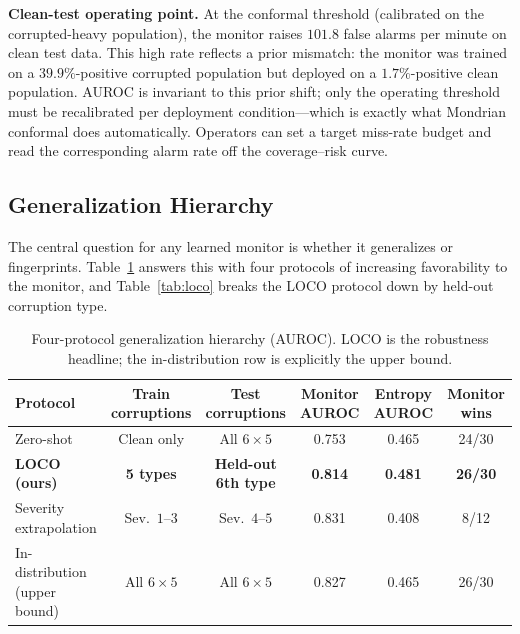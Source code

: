 \documentclass[letterpaper, 10 pt, conference]{ieeeconf}  %
\begin{document}

\textbf{Clean-test operating point.} At the conformal threshold (calibrated
on the corrupted-heavy population), the monitor raises $101.8$ false alarms
per minute on clean test data. This high rate reflects a prior mismatch: the
monitor was trained on a $39.9\%$-positive corrupted population but deployed
on a $1.7\%$-positive clean population. AUROC is invariant to this prior
shift; only the operating threshold must be recalibrated per deployment
condition---which is exactly what Mondrian conformal does automatically.
Operators can set a target miss-rate budget and read the corresponding alarm
rate off the coverage--risk curve.

\subsection{Generalization Hierarchy}

The central question for any learned monitor is whether it generalizes or
fingerprints. Table~\ref{tab:hierarchy} answers this with four protocols of
increasing favorability to the monitor, and Table~\ref{tab:loco} breaks the
LOCO protocol down by held-out corruption type.

\begin{table}[t]
\caption{Four-protocol generalization hierarchy (AUROC). LOCO is the robustness headline; the in-distribution row is explicitly the upper bound.}
\label{tab:hierarchy}
\centering
\small
\begin{tabular}{lccccc}
\toprule
Protocol & Train corruptions & Test corruptions & Monitor AUROC & Entropy AUROC & Monitor wins \\
\midrule
Zero-shot                          & Clean only & All $6\times5$       & 0.753 & 0.465 & 24/30 \\
\textbf{LOCO (ours)}               & \textbf{5 types} & \textbf{Held-out 6th type} & \textbf{0.814} & \textbf{0.481} & \textbf{26/30} \\
Severity extrapolation             & Sev.\ $1$--$3$ & Sev.\ $4$--$5$    & 0.831 & 0.408 & 8/12 \\
In-distribution (upper bound)      & All $6\times5$ & All $6\times5$     & 0.827 & 0.465 & 26/30 \\
\bottomrule
\end{tabular}
\end{table}
\end{document}
